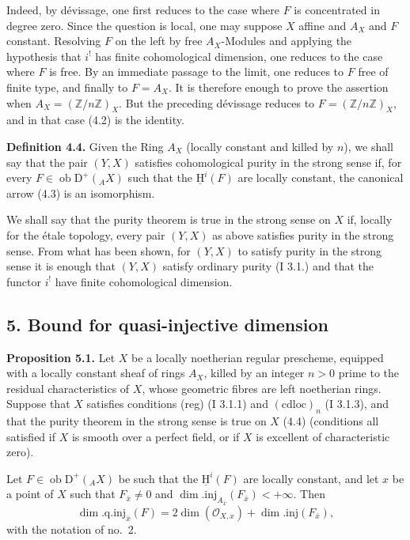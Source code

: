 \documentclass[11pt]{article}
\providecommand{\uH}{\underline{\mathrm H}}
\newcommand{\D}{\mathrm{D}}
\newcommand{\Z}{\mathbb{Z}}
\newcommand{\ob}{\operatorname{ob}}
\providecommand{\ob}{\operatorname{ob}}
\providecommand{\Z}{\mathbb Z}
\begin{document}
Indeed, by dévissage, one first reduces to the case where $F$ is concentrated in degree zero. Since the question is local, one may suppose $X$ affine and $A_X$ and $F$ constant. Resolving $F$ on the left by free $A_X$-Modules and applying the hypothesis that $i^!$ has finite cohomological dimension, one reduces to the case where $F$ is free. By an immediate passage to the limit, one reduces to $F$ free of finite type, and finally to $F=A_X$. It is therefore enough to prove the assertion when $A_X=(\Z/n\Z)_X$. But the preceding dévissage reduces to $F=(\Z/n\Z)_X$, and in that case (4.2) is the identity.

\textbf{Definition 4.4.} Given the Ring $A_X$ (locally constant and killed by $n$), we shall say that the pair $(Y,X)$ satisfies cohomological purity in the strong sense if, for every $F\in\ob\D^+({}_A X)$ such that the $\uH^i(F)$ are locally constant, the canonical arrow (4.3) is an isomorphism.

We shall say that the purity theorem is true in the strong sense on $X$ if, locally for the étale topology, every pair $(Y,X)$ as above satisfies purity in the strong sense. From what has been shown, for $(Y,X)$ to satisfy purity in the strong sense it is enough that $(Y,X)$ satisfy ordinary purity (I 3.1.) and that the functor $i^!$ have finite cohomological dimension.

\subsection*{5. Bound for quasi-injective dimension}

\textbf{Proposition 5.1.} Let $X$ be a locally noetherian regular prescheme, equipped with a locally constant sheaf of rings $A_X$, killed by an integer $n>0$ prime to the residual characteristics of $X$, whose geometric fibres are left noetherian rings. Suppose that $X$ satisfies conditions (reg) (I 3.1.1) and $(\mathrm{cdloc})_n$ (I 3.1.3), and that the purity theorem in the strong sense is true on $X$ (4.4) (conditions all satisfied if $X$ is smooth over a perfect field, or if $X$ is excellent of characteristic zero).

Let $F\in\ob\D^+({}_A X)$ be such that the $\uH^i(F)$ are locally constant, and let $x$ be a point of $X$ such that $F_{\bar{x}}\neq0$ and $\dim.\mathrm{inj}_{A_{\bar{x}}}(F_{\bar{x}})<+\infty$. Then
\[
        \dim.\mathrm{q.inj}_{\bar{x}}(F)=2\dim(\mathcal{O}_{X,x})+\dim.\mathrm{inj}(F_{\bar{x}}),
\]
with the notation of no.~2.
\end{document}
